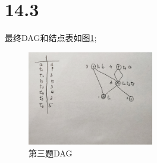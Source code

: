 \documentclass[UTF8]{ctexart}
\begin{document}
\section*{14.3}

最终DAG和结点表如图\ref{dag};

\begin{figure}[htbp]
    \centering
        \includegraphics[width=5.5cm]{dag.png}
    \caption{第三题DAG}
    \label{dag}
\end{figure}
\end{document}
